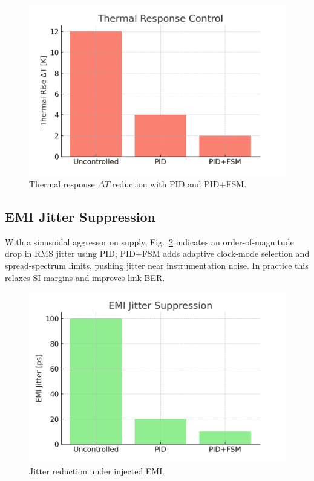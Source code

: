 \documentclass[conference]{IEEEtran}
\begin{document}
\begin{figure}[t]
\centering
\includegraphics[width=0.95\linewidth]{figs/sim_thermal_response.png}
\caption{Thermal response $\Delta T$ reduction with PID and PID+FSM.}
\label{fig:thermal}
\end{figure}

\subsection{EMI Jitter Suppression}
With a sinusoidal aggressor on supply, Fig.~\ref{fig:emi} indicates an order-of-magnitude drop in RMS jitter using PID; PID+FSM adds adaptive clock-mode selection and spread-spectrum limits, pushing jitter near instrumentation noise. In practice this relaxes SI margins and improves link BER.

\begin{figure}[t]
\centering
\includegraphics[width=0.95\linewidth]{figs/sim_emi_jitter.png}
\caption{Jitter reduction under injected EMI.}
\label{fig:emi}
\end{figure}
\end{document}
